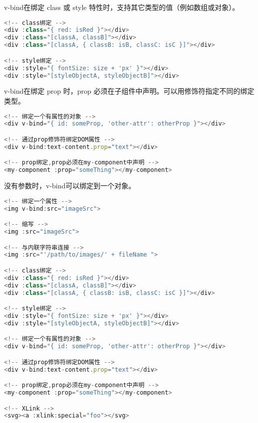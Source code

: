 \begin{compactitem}
\item v-bind在绑定 class 或 style 特性时，支持其它类型的值（例如数组或对象）。


\begin{lstlisting}[language=JavaScript]
<!-- class绑定 -->
<div :class="{ red: isRed }"></div>
<div :class="[classA, classB]"></div>
<div :class="[classA, { classB: isB, classC: isC }]"></div>

<!-- style绑定 -->
<div :style="{ fontSize: size + 'px' }"></div>
<div :style="[styleObjectA, styleObjectB]"></div>
\end{lstlisting}

\item v-bind在绑定 prop 时，prop 必须在子组件中声明。可以用修饰符指定不同的绑定类型。

\begin{lstlisting}[language=JavaScript]
<!-- 绑定一个有属性的对象 -->
<div v-bind="{ id: someProp, 'other-attr': otherProp }"></div>

<!-- 通过prop修饰符绑定DOM属性 -->
<div v-bind:text-content.prop="text"></div>

<!-- prop绑定,prop必须在my-component中声明 -->
<my-component :prop="someThing"></my-component>
\end{lstlisting}

\end{compactitem}

没有参数时，v-bind可以绑定到一个对象。

\begin{lstlisting}[language=JavaScript]
<!-- 绑定一个属性 -->
<img v-bind:src="imageSrc">

<!-- 缩写 -->
<img :src="imageSrc">

<!-- 与内联字符串连接 -->
<img :src="'/path/to/images/' + fileName ">

<!-- class绑定 -->
<div :class="{ red: isRed }"></div>
<div :class="[classA, classB]"></div>
<div :class="[classA, { classB: isB, classC: isC }]"></div>

<!-- style绑定 -->
<div :style="{ fontSize: size + 'px' }"></div>
<div :style="[styleObjectA, styleObjectB]"></div>

<!-- 绑定一个有属性的对象 -->
<div v-bind="{ id: someProp, 'other-attr': otherProp }"></div>

<!-- 通过prop修饰符绑定DOM属性 -->
<div v-bind:text-content.prop="text"></div>

<!-- prop绑定,prop必须在my-component中声明 -->
<my-component :prop="someThing"></my-component>

<!-- XLink -->
<svg><a :xlink:special="foo"></svg>
\end{lstlisting}

